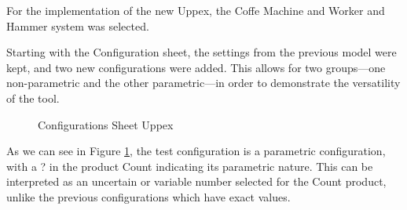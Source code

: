 
For the implementation of the new Uppex, the Coffe Machine and  Worker and Hammer system was selected. 


Starting with the Configuration sheet, the settings from the previous model were kept, and two new configurations were added. This allows for two groups—one non-parametric and the other parametric—in order to demonstrate the versatility of the tool.


\begin{figure}[H]
    \centering
    \begin{minipage}{0.48\textwidth}
        \centering
        \caption{Configurations Sheet Uppex}
        \label{fig:cof_WH}
    \end{minipage}
\end{figure}

As we can see in Figure \ref{fig:cof_WH}, the test configuration is a parametric configuration, with a ? in the product Count indicating its parametric nature. This can be interpreted as an uncertain or variable number selected for the Count product, unlike the previous configurations which have exact values.


